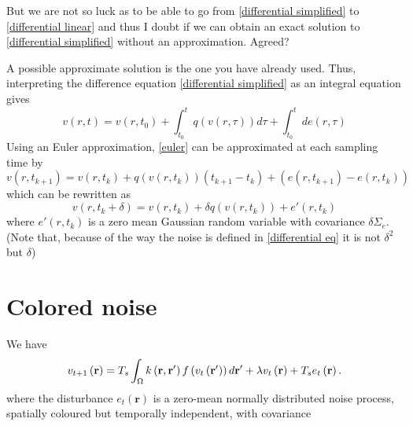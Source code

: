 \documentclass[onecolumn,draftcls]{IEEEtran}
\begin{document}
But we are not so luck as to be able to go from \ref{differential simplified} to \ref{differential linear} and thus I doubt if we can obtain an exact solution to \ref{differential simplified} without an approximation. Agreed?

A possible approximate solution is the one you have already used. Thus, interpreting the difference equation \ref{differential simplified} as an integral equation gives
\begin{equation}\label{euler}
	v\left(r,t\right) =  v(r,t_0) + \int_{t_0}^{t} q\left(v(r,\tau) \right) d\tau  + \int_{t_0}^{t} d e\left(r,\tau\right)
\end{equation}
Using an Euler approximation, \ref{euler} can be approximated at each sampling time by
\begin{equation}\label{euler approx 1}
	v\left(r,t_{k+1} \right) =  v(r,t_k) + q\left(v(r,t_k)\right) (t_{k+1} - t_k) + (e(r,t_{k+1}) - e(r,t_k))
\end{equation}
which can be rewritten as
\begin{equation}\label{euler approx 2}
	v\left(r,t_k + \delta \right) =  v(r,t_k) + \delta q\left(v(r,t_k)\right) + e'(r,t_k)
\end{equation}
where $e'(r,t_k)$ is a zero mean Gaussian random variable with covariance $\delta\Sigma_e$. (Note that, because of the way the noise is defined in \ref{differential eq} it is not $\delta^2$ but $\delta$)

\section{Colored noise}
We have
\begin{equation}
v_{t + 1}\left( \mathbf{r} \right)  = T_s\int_\Omega  {k\left( {{\bf{r}} , {\bf{r'}}} \right)f\left( {{v_t}\left( \bf{r'} \right)} \right)d{\bf{r'}}} + \lambda v_t\left( {\bf{r}} \right) + T_se_t\left( {\mathbf{r}} \right).
\end{equation}
where the disturbance $e_t(\mathbf r)$ is a zero-mean normally distributed noise process, spatially coloured but temporally independent, with covariance 
\end{document}
